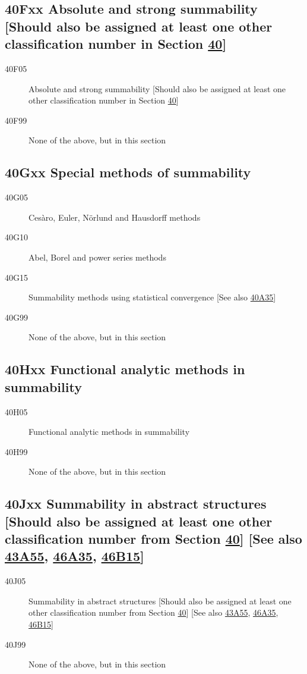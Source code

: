 \documentclass[letterpaper]{article}
\begin{document}
\subsection*{40Fxx  Absolute and strong summability [Should also be assigned at least one other classification number in Section \hyperref[40-XX]{40}] }\label{40Fxx}
\begin{description}  
\item [40F05]\label{40F05} Absolute and strong summability [Should also be assigned at least one other classification number in Section \hyperref[40-XX]{40}]
\item [40F99]\label{40F99} None of the above, but in this section
\end{description}
\subsection*{40Gxx  Special methods of summability }\label{40Gxx}
\begin{description}  
\item [40G05]\label{40G05} Ces\`{a}ro, Euler, N\"{o}rlund and Hausdorff methods
\item [40G10]\label{40G10} Abel, Borel and power series methods
\item [40G15]\label{40G15} Summability methods using statistical convergence [See also \hyperref[40A35]{40A35}]
\item [40G99]\label{40G99} None of the above, but in this section
\end{description}
\subsection*{40Hxx  Functional analytic methods in summability}\label{40Hxx}
\begin{description}  
\item [40H05]\label{40H05} Functional analytic methods in summability
\item [40H99]\label{40H99} None of the above, but in this section
\end{description}
\subsection*{40Jxx  Summability in abstract structures [Should also be assigned at least one other classification number from Section \hyperref[40-XX]{40}] [See also \hyperref[43A55]{43A55}, \hyperref[46A35]{46A35}, \hyperref[46B15]{46B15}] }\label{40Jxx}
\begin{description}  
\item [40J05]\label{40J05} Summability in abstract structures [Should also be assigned at least one other classification number from Section \hyperref[40-XX]{40}] [See also \hyperref[43A55]{43A55}, \hyperref[46A35]{46A35}, \hyperref[46B15]{46B15}]
\item [40J99]\label{40J99} None of the above, but in this section
\end{description}
\end{document}
